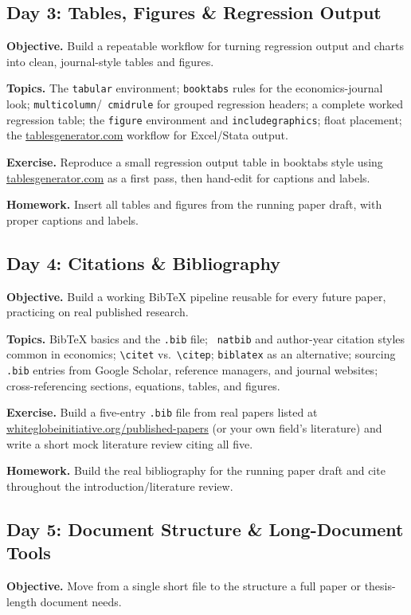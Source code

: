 \documentclass[11pt,a4paper]{article}
\begin{document}
\vspace{6pt}
\subsection*{Day 3: Tables, Figures \& Regression Output}
\textbf{Objective.} Build a repeatable workflow for turning regression
output and charts into clean, journal-style tables and figures.

\textbf{Topics.} The \texttt{tabular} environment; \texttt{booktabs}
rules for the economics-journal look; \texttt{multicolumn}/\texttt{
cmidrule} for grouped regression headers; a complete worked regression
table; the \texttt{figure} environment and \texttt{includegraphics};
float placement; the \url{tablesgenerator.com} workflow for Excel/Stata
output.

\textbf{Exercise.} Reproduce a small regression output table in
booktabs style using \url{tablesgenerator.com} as a first pass, then
hand-edit for captions and labels.

\textbf{Homework.} Insert all tables and figures from the running
paper draft, with proper captions and labels.

\vspace{6pt}
\subsection*{Day 4: Citations \& Bibliography}
\textbf{Objective.} Build a working BibTeX pipeline reusable for every
future paper, practicing on real published research.

\textbf{Topics.} BibTeX basics and the \texttt{.bib} file; \texttt{
natbib} and author-year citation styles common in economics;
\texttt{\textbackslash citet} vs.\ \texttt{\textbackslash citep};
\texttt{biblatex} as an alternative; sourcing \texttt{.bib} entries
from Google Scholar, reference managers, and journal websites;
cross-referencing sections, equations, tables, and figures.

\textbf{Exercise.} Build a five-entry \texttt{.bib} file from real
papers listed at \url{whiteglobeinitiative.org/published-papers}
(or your own field's literature) and write a short mock literature
review citing all five.

\textbf{Homework.} Build the real bibliography for the running paper
draft and cite throughout the introduction/literature review.

\vspace{6pt}
\subsection*{Day 5: Document Structure \& Long-Document Tools}
\textbf{Objective.} Move from a single short file to the structure a
full paper or thesis-length document needs.
\end{document}
